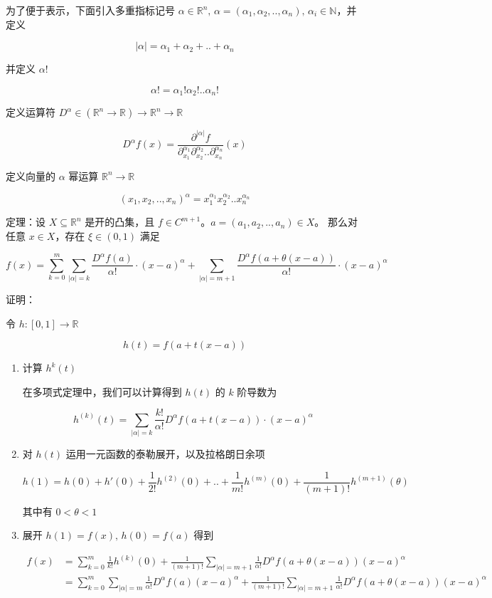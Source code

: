 \documentclass[12pt,a4paper]{ctexart}
\begin{document}
为了便于表示，下面引入多重指标记号 $\alpha \in \mathbb{R}^n,\, \alpha = (\alpha_1, \alpha_2, .., \alpha_n),\, \alpha_i \in \mathbb{N}$，并定义 

\[
| \alpha | = \alpha_1 + \alpha_2 + .. + \alpha_n
\]


并定义 $\alpha !$  

\[
\alpha ! = \alpha_1!\alpha_2! .. \alpha_n!
\]

定义运算符 $D^{\alpha} \in  (\mathbb{R}^n \to \mathbb{R}) \to \mathbb{R}^n \to \mathbb{R}$

\[
D^{\alpha} f(x) = \frac{\partial^{| \alpha |}f}{\partial^{\alpha_1}_{x_1}\partial^{\alpha_2}_{x_2}..\partial^{\alpha_n}_{x_n}}(x)
\]

定义向量的 $\alpha$ 幂运算 $\mathbb{R}^n \to \mathbb{R}$

\[
(x_1,x_2,..,x_n)^{\alpha} = x_1^{\alpha_1}  x_2^{\alpha_2} ..  x_n^{\alpha_n}
\]

定理：设 $X \subseteq \mathbb{R}^n$ 是开的凸集，且 $f \in C^{m+1}$。$a = (a_1,a_2,..,a_n) \in X$。
那么对任意 $x \in X$，存在 $\xi \in (0,1)$ 满足


\[
f(x) = \sum_{k=0}^{m} \sum_{ | \alpha | = k } \frac{D^{\alpha}f(a)}{\alpha !} \cdot (x-a)^{\alpha} + \sum_{|\alpha| = m+1} \frac{D^{\alpha} f(a+ \theta(x-a))}{\alpha!} \cdot (x-a)^{\alpha}
\]

证明：

令 $h: [0,1] \to \mathbb{R}$ 

\[
h(t) =  f(a + t(x-a))
\]

\begin{enumerate}
    \item 计算 $h^{k}(t)$

    在多项式定理中，我们可以计算得到 $h(t)$ 的 $k$ 阶导数为

    \[
        h^{(k)}(t) =  \sum_{ | \alpha | = k } \frac{k!}{\alpha !} D^{\alpha}f(a+t(x-a))\cdot (x-a)^{\alpha}
    \]

    \item 对 $h(t)$ 运用一元函数的泰勒展开，以及拉格朗日余项

    \[
    h(1) = h(0) + h'(0) + \frac{1}{2!}h^{(2)}(0) + .. +\frac{1}{m!}h^{(m)}(0) + \frac{1}{(m+1)!}h^{(m+1)}(\theta)
    \]

    其中有 $0 < \theta < 1$

    \item 展开 $h(1) = f(x),\, h(0) = f(a)$ 得到

    \begin{align*}
        f(x) &= \sum_{k=0}^{m}\frac{1}{k!}h^{(k)}(0) + \frac{1}{(m+1)!}\sum_{|\alpha| = m+1}\frac{1}{\alpha!}D^{\alpha}f(a + \theta(x-a))(x-a)^\alpha \\
            &= \sum_{k=0}^{m}\sum_{|\alpha| = m} \frac{1}{\alpha !}D^{\alpha}f(a)(x-a)^\alpha + \frac{1}{(m+1)!}\sum_{|\alpha| = m+1}\frac{1}{\alpha!}D^{\alpha}f(a + \theta(x-a))(x-a)^\alpha
    \end{align*}

\end{enumerate}
\end{document}
